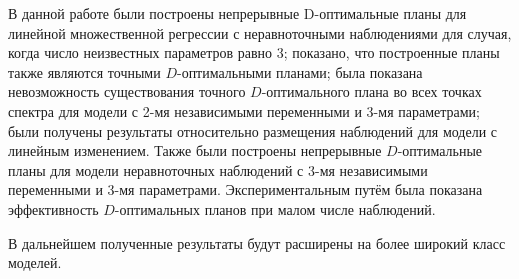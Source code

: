В данной работе были построены непрерывные D-оптимальные планы для линейной множественной регрессии с неравноточными наблюдениями для случая, когда число неизвестных параметров равно 3; показано, что построенные планы также являются точными $D$-оптимальными планами; была показана невозможность существования точного $D$-оптимального плана во всех точках спектра для модели с 2-мя независимыми переменными и 3-мя параметрами; были получены результаты относительно размещения наблюдений для модели с линейным изменением. Также были построены непрерывные $D$-оптимальные планы для модели неравноточных наблюдений с 3-мя независимыми переменными и 3-мя параметрами. Экспериментальным путём была показана эффективность $D$-оптимальных планов при малом числе наблюдений.

В дальнейшем полученные результаты будут расширены на более широкий класс моделей.